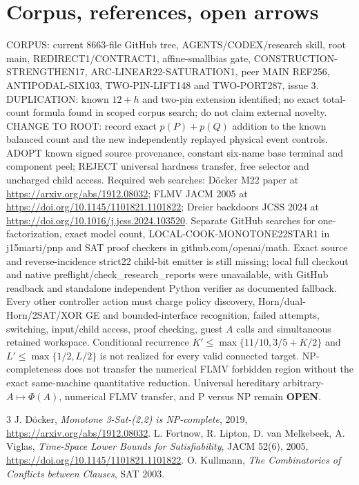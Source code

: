 \documentclass[11pt]{article}
\begin{document}
\section{Corpus, references, open arrows}
CORPUS: current 8663-file GitHub tree, AGENTS/CODEX/research skill, root main, REDIRECT1/CONTRACT1, affine-smallbias gate, CONSTRUCTION-STRENGTHEN17, ARC-LINEAR22-SATURATION1, peer MAIN REF256, ANTIPODAL-SIX103, TWO-PIN-LIFT148 and TWO-PORT287, issue 3. DUPLICATION: known $12+h$ and two-pin extension identified; no exact total-count formula found in scoped corpus search; do not claim external novelty. CHANGE TO ROOT: record exact $p(P)+p(Q)$ addition to the known balanced count and the new independently replayed physical event controls. ADOPT known signed source provenance, constant six-name base terminal and component peel; REJECT universal hardness transfer, free selector and uncharged child access. Required web searches: D\"ocker M22 paper at \url{https://arxiv.org/abs/1912.08032}; FLMV JACM 2005 at \url{https://doi.org/10.1145/1101821.1101822}; Dreier backdoors JCSS 2024 at \url{https://doi.org/10.1016/j.jcss.2024.103520}. Separate GitHub searches for one-factorization, exact model count, LOCAL-COOK-MONOTONE22STAR1 in j15marti/pnp and SAT proof checkers in github.com/openai/math. Exact source and reverse-incidence strict22 child-bit emitter is still missing; local full checkout and native preflight/check_research_reports were unavailable, with GitHub readback and standalone independent Python verifier as documented fallback.
Every other controller action must charge policy discovery, Horn/dual-Horn/2SAT/XOR GE and bounded-interface recognition, failed attempts, switching, input/child access, proof checking, guest $A$ calls and simultaneous retained workspace. Conditional recurrence $K'\le\max\{11/10,3/5+K/2\}$ and $L'\le\max\{1/2,L/2\}$ is not realized for every valid connected target. NP-completeness does not transfer the numerical FLMV forbidden region without the exact same-machine quantitative reduction. Universal hereditary arbitrary-$A\mapsto\Phi(A)$, numerical FLMV transfer, and P versus NP remain \textbf{OPEN}.
\begin{thebibliography}{3}
 J. D\"ocker, \emph{Monotone 3-Sat-(2,2) is NP-complete}, 2019, \url{https://arxiv.org/abs/1912.08032}.
 L. Fortnow, R. Lipton, D. van Melkebeek, A. Viglas, \emph{Time-Space Lower Bounds for Satisfiability}, JACM 52(6), 2005, \url{https://doi.org/10.1145/1101821.1101822}.
 O. Kullmann, \emph{The Combinatorics of Conflicts between Clauses}, SAT 2003.
\end{thebibliography}
\end{document}
